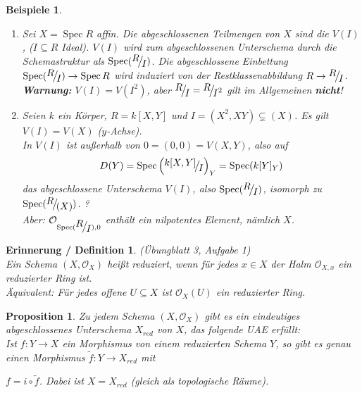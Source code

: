 \documentclass[a4paper,oneside]{scrbook}
\theoremstyle{break}
\newtheorem{ErinnDef}[Def]{Erinnerung / Definition}
\newtheorem{Prop}[Def]{Proposition}
\newtheorem{Bsp}[Def]{Beispiele}
\theoremstyle{nonumberbreak}
\theoremstyle{nonumberplain}
\theoremstyle{break}
\newcommand{\Spec}{%
	\ensuremath{\operatorname{Spec}}%
}
\newcommand{\FakRaum}[2]{
  \raisebox{0.7ex}{\ensuremath{#1}}
  \ensuremath{\mkern-3mu}\big/\ensuremath{\mkern-3mu}
  \raisebox{-0.6ex}{\ensuremath{#2}}}
\begin{document}
\begin{Bsp}
  \begin{enumerate}
  \item Sei $X=\Spec R$ affin. Die abgeschlossenen Teilmengen von $X$ sind die $V(I)$, ($I\subseteq R$ Ideal).
    $V(I)$ wird zum abgeschlossenen Unterschema durch die Schemastruktur als $\Spec (\FakRaum{R}{I})$.
    Die abgeschlossene Einbettung $\Spec (\FakRaum{R}{I})\to\Spec R$ wird induziert von der Restklassenabbildung $R\to\FakRaum{R}{I}$.
    \textbf{Warnung:} $V(I)=V(I^2)$, aber $\FakRaum{R}{I}=\FakRaum{R}{I^2}$ gilt im Allgemeinen \textbf{nicht}!
  \item Seien $k$ ein Körper, $R=k[X,Y]$ und $I=(X^2,XY)\subsetneq(X)$. Es gilt $V(I)=V(X)$ ($y$-Achse). \\
    In $V(I)$ ist außerhalb von $0=(0,0)=V(X,Y)$, also auf 
    \begin{align*}
      D(Y)=\Spec\left(\FakRaum{k[X,Y]}{I}\right)_Y=\Spec(k[Y]_Y)
    \end{align*}
    das abgeschlossene Unterschema $V(I)$, also $\Spec(\FakRaum{R}{I})$, isomorph zu $\Spec(\FakRaum{R}{(X)})$. ? \\
    Aber: $\mathcal O_{\Spec(\FakRaum{R}{I}),0}$ enthält ein nilpotentes Element, nämlich $X$.
  \end{enumerate}
\end{Bsp}

\begin{ErinnDef}
  \label{erinndef:6.3}
  (Übungblatt 3, Aufgabe 1) \\
  Ein Schema $(X,\mathcal O_X)$ heißt reduziert, wenn für jedes $x\in X$ der Halm $\mathcal O_{X,x}$ ein reduzierter Ring ist. \\
  Äquivalent: Für jedes offene $U\subseteq X$ ist $\mathcal O_X(U)$ ein reduzierter Ring.
\end{ErinnDef}



\begin{Prop}
  \label{prop:6.4}
  Zu jedem Schema $(X,\mathcal O_X)$ gibt es ein eindeutiges abgeschlossenes Unterschema $X_{red}$ von $X$, das folgende UAE erfüllt: \\
  Ist $f:Y\to X$ ein Morphismus von einem reduzierten Schema $Y$, so gibt es genau einen Morphismus $\tilde{f}:Y\to X_{red}$ mit 
  \begin{center}
  \end{center}
  $f=i\circ\tilde{f}$. Dabei ist $X=X_{red}$ (gleich als topologische Räume).
\end{Prop}
\end{document}
